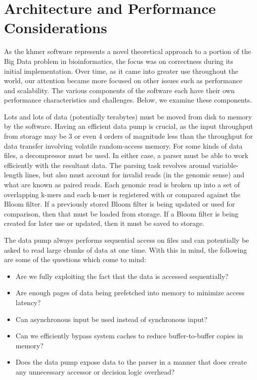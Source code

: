 \documentclass{article}
\begin{document}
\section{Architecture and Performance Considerations}

As the khmer software represents a novel theoretical approach to a portion of the Big Data problem in bioinformatics, the focus was on correctness during its initial implementation. Over time, as it came into greater use throughout the world, our attention became more focused on other issues such as performance and scalability. The various components of the software each have their own performance characteristics and challenges. Below, we examine these components.

Lots and lots of data (potentially terabytes) must be moved from disk to memory by the software. Having an efficient data pump is crucial, as the input throughput from storage may be 3 or even 4 orders of magnitude less than the throughput for data transfer involving volatile random-access memory. For some kinds of data files, a decompressor must be used. In either case, a parser must be able to work efficiently with the resultant data. The parsing task revolves around variable-length lines, but also must account for invalid reads (in the genomic sense) and what are known as paired reads. Each genomic read is broken up into a set of overlapping k-mers and each k-mer is registered with or compared against the Bloom filter. If a previously stored Bloom filter is being updated or used for comparison, then that must be loaded from storage. If a Bloom filter is being created for later use or updated, then it must be saved to storage.

The data pump always performs sequential access on files and can potentially be asked to read large chunks of data at one time. With this in mind, the following are some of the questions which come to mind:
\begin{itemize}
\item Are we fully exploiting the fact that the data is accessed sequentially?
\item Are enough pages of data being prefetched into memory to minimize access latency?
\item Can asynchronous input be used instead of synchronous input?
\item Can we efficiently bypass system caches to reduce buffer-to-buffer copies in memory?
\item Does the data pump expose data to the parser in a manner that does create any unnecessary accessor or decision logic overhead?
\end{itemize}
\end{document}

